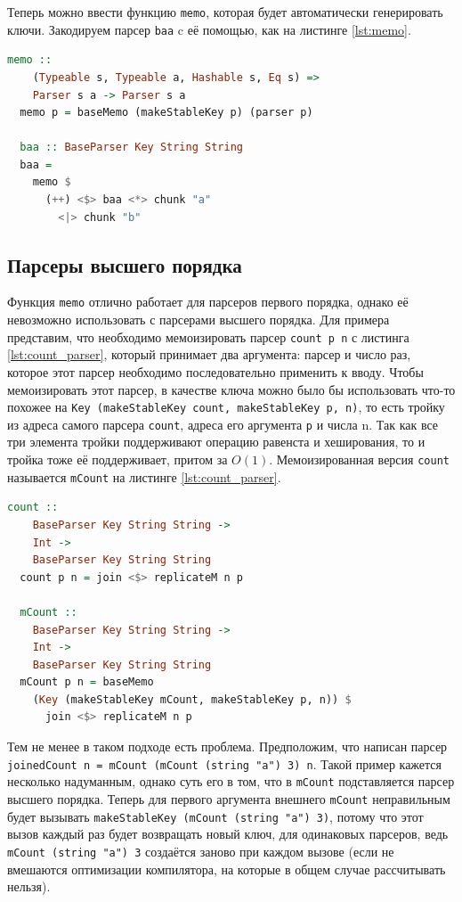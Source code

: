 \documentclass[times]{itmo-student-thesis}
\begin{document}
Теперь можно ввести функцию \lstinline{memo}, которая будет автоматически генерировать ключи. Закодируем парсер \lstinline{baa} c её
помощью, как на листинге \ref{lst:memo}.

\begin{lstlisting}[language=Haskell,float=!h,caption={Memo с автоматическим ключом},label={lst:memo}]
  memo :: 
    (Typeable s, Typeable a, Hashable s, Eq s) => 
    Parser s a -> Parser s a
  memo p = baseMemo (makeStableKey p) (parser p)

  baa :: BaseParser Key String String
  baa =
    memo $
      (++) <$> baa <*> chunk "a"
        <|> chunk "b"
\end{lstlisting}

\subsection{Парсеры высшего порядка}

Функция \lstinline{memo} отлично работает для парсеров первого порядка, однако её невозможно использовать с
парсерами высшего порядка. Для примера представим, что необходимо мемоизировать парсер
\lstinline{count p n} с листинга \ref{lst:count_parser}, который  принимает два аргумента: парсер и число раз,
которое этот парсер необходимо последовательно применить к вводу. Чтобы мемоизировать этот парсер, в качестве ключа
можно было бы использовать что-то похожее на \lstinline{Key (makeStableKey count, makeStableKey p, n)}, то есть тройку из
адреса самого парсера \lstinline{count}, адреса его аргумента \lstinline{p} и числа n. Так как все три элемента тройки поддерживают
операцию равенста и хеширования, то и тройка тоже её поддерживает, притом за $O(1)$. Мемоизированная версия \lstinline{count} называется \lstinline{mCount}
на листинге \ref{lst:count_parser}.

\begin{lstlisting}[language=Haskell,float=!h,caption={Парсер высшего порядка count},label={lst:count_parser}]
  count :: 
    BaseParser Key String String -> 
    Int -> 
    BaseParser Key String String
  count p n = join <$> replicateM n p

  mCount :: 
    BaseParser Key String String -> 
    Int -> 
    BaseParser Key String String
  mCount p n = baseMemo 
    (Key (makeStableKey mCount, makeStableKey p, n)) $ 
      join <$> replicateM n p
\end{lstlisting}

Тем не менее в таком подходе есть проблема. Предположим, что написан парсер \lstinline{joinedCount n = mCount (mCount (string "a") 3) n}.
Такой пример кажется несколько надуманным, однако суть его в том, что в \lstinline{mCount} подставляется парсер высшего порядка.
Теперь для первого аргумента внешнего \lstinline{mCount} неправильным будет вызывать \lstinline{makeStableKey (mCount (string "a") 3)}, потому что
этот вызов каждый раз будет возвращать новый ключ, для одинаковых парсеров, ведь \lstinline{mCount (string "a") 3} создаётся заново при каждом вызове
(если не вмешаются оптимизации компилятора, на которые в общем случае рассчитывать нельзя).
\end{document}
